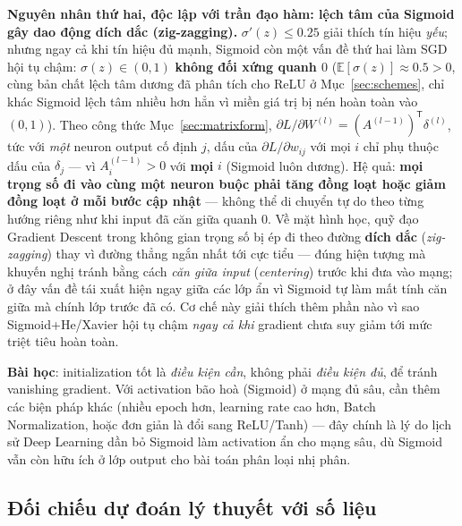 \documentclass[12pt,a4paper]{article}
\newcommand{\en}[1]{\textit{#1}}
\newcommand{\T}{^{\mathsf{T}}}
\begin{document}
\textbf{Nguyên nhân thứ hai, độc lập với trần đạo hàm: lệch tâm của
Sigmoid gây dao động dích dắc (zig-zagging).} $\sigma'(z)\le0.25$ giải
thích tín hiệu \emph{yếu}; nhưng ngay cả khi tín hiệu đủ mạnh, Sigmoid còn
một vấn đề thứ hai làm SGD hội tụ chậm: $\sigma(z)\in(0,1)$
\textbf{không đối xứng quanh $0$} ($\mathbb E[\sigma(z)]\approx0.5>0$,
cùng bản chất lệch tâm dương đã phân tích cho ReLU ở Mục~\ref{sec:schemes},
chỉ khác Sigmoid lệch tâm nhiều hơn hẳn vì miền giá trị bị nén hoàn toàn
vào $(0,1)$). Theo công thức Mục~\ref{sec:matrixform},
$\partial L/\partial W^{(l)}=(A^{(l-1)})\T\delta^{(l)}$, tức với \emph{một}
neuron output cố định $j$, dấu của $\partial L/\partial w_{ij}$ với mọi
$i$ chỉ phụ thuộc dấu của $\delta_j$ --- vì $A^{(l-1)}_{i}>0$ với
\textbf{mọi} $i$ (Sigmoid luôn dương). Hệ quả: \textbf{mọi trọng số đi vào
cùng một neuron buộc phải tăng đồng loạt hoặc giảm đồng loạt ở mỗi bước
cập nhật} --- không thể di chuyển tự do theo từng hướng riêng như khi input
đã căn giữa quanh $0$. Về mặt hình học, quỹ đạo Gradient Descent trong
không gian trọng số bị ép đi theo đường \textbf{dích dắc}
(\en{zig-zagging}) thay vì đường thẳng ngắn nhất tới cực tiểu --- đúng
hiện tượng mà \citet{lecun1998efficient} khuyến nghị tránh bằng cách
\emph{căn giữa input} (\en{centering}) trước khi đưa vào mạng; ở đây vấn
đề tái xuất hiện ngay giữa các lớp ẩn vì Sigmoid tự làm mất tính căn giữa
mà chính lớp trước đã có. Cơ chế này giải thích thêm phần nào vì sao
Sigmoid+He/Xavier hội tụ chậm \emph{ngay cả khi} gradient chưa suy giảm
tới mức triệt tiêu hoàn toàn.

\textbf{Bài học}: initialization tốt là \emph{điều kiện cần}, không phải
\emph{điều kiện đủ}, để tránh vanishing gradient. Với activation bão hoà
(Sigmoid) ở mạng đủ sâu, cần thêm các biện pháp khác (nhiều epoch hơn,
learning rate cao hơn, Batch Normalization, hoặc đơn giản là đổi sang
ReLU/Tanh) --- đây chính là lý do lịch sử Deep Learning dần bỏ Sigmoid làm
activation ẩn cho mạng sâu, dù Sigmoid vẫn còn hữu ích ở lớp output cho
bài toán phân loại nhị phân.

\subsection{Đối chiếu dự đoán lý thuyết với số liệu}
\end{document}
